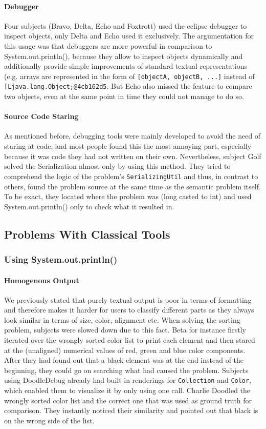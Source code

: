 \documentclass[english]{acm_proc_article-sp}
\begin{document}
\paragraph{Debugger}
Four subjects (Bravo, Delta, Echo and Foxtrott) used the eclipse debugger to inspect objects, only Delta and Echo used it exclusively. The argumentation for this usage was that debuggers are more powerful in comparison to System.out.println(), because they allow to inspect objects dynamically and additionally provide simple improvements of standard textual representations (e.g. arrays are represented in the form of \verb-[objectA, objectB, ...]- instead of \verb-[Ljava.lang.Object;@4cb162d5-. But Echo also missed the feature to compare two objects, even at the same point in time they could not manage to do so.
\paragraph{Source Code Staring}
As mentioned before, debugging tools were mainly developed to avoid the need of staring at code, and most people found this the most annoying part, especially because it was code they had not written on their own. Nevertheless, subject Golf solved the Serialization almost only by using this method. They tried to comprehend the logic of the problem's \verb.SerializingUtil. and thus, in contrast to others, found the problem source at the same time as the semantic problem itself. To be exact, they located where the problem was (long casted to int) and used System.out.println() only to check what it resulted in.

\subsection{Problems With Classical Tools}

\subsubsection{Using System.out.println()}
\paragraph{Homogenous Output}
We previously stated that purely textual output is poor in terms of formatting and therefore makes it harder for users to classify different parts as they always look similar in terms of size, color, alignment etc.
When solving the sorting problem, subjects were slowed down due to this fact. Beta for instance firstly iterated over the wrongly sorted color list to print each element and then stared at the (unaligned) numerical values of red, green and blue color components. After they had found out that a black element was at the end instead of the beginning, they could go on searching what had caused the problem. Subjects using DoodleDebug already had built-in renderings for \verb.Collection. and \verb.Color., which enabled them to visualize it by only using one call. Charlie Doodled the wrongly sorted color list and the correct one that was used as ground truth for comparison. They instantly noticed their similarity and pointed out that black is on the wrong side of the list.
\end{document}
